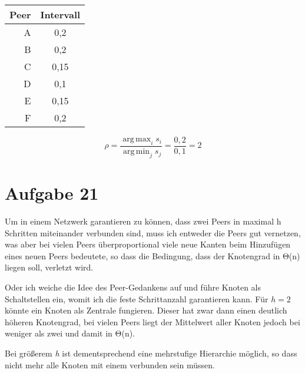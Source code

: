 \documentclass[10pt,a4paper]{article}
\DeclareMathOperator*{\argmax}{arg\,max}
\DeclareMathOperator*{\argmin}{arg\,min}
\begin{document}
\begin{tabular}{ r | c }
  Peer & Intervall \\
  \hline
  A & 0,2 \\
  B & 0,2 \\
  C & 0,15 \\
  D & 0,1 \\
  E & 0,15 \\
  F & 0,2 \\
\end{tabular}

\begin{equation}
  \rho = \frac{\argmax_i s_i}{\argmin_j s_j} = \frac{0,2}{0,1} = 2

\end{equation}

\section*{Aufgabe 21}
Um in einem Netzwerk garantieren zu können, dass zwei Peers in maximal h Schritten miteinander verbunden sind, muss ich entweder die Peers gut vernetzen, was aber bei vielen Peers überproportional viele neue Kanten beim Hinzufügen eines neuen Peers bedeutete, so dass die Bedingung, dass der Knotengrad in Θ(n) liegen soll, verletzt wird.

Oder ich weiche die Idee des Peer-Gedankens auf und führe Knoten als Schaltstellen ein, womit ich die feste Schrittanzahl garantieren kann. Für $h=2$ könnte ein Knoten als Zentrale fungieren. Dieser hat zwar dann einen deutlich höheren Knotengrad, bei vielen Peers liegt der Mittelwert aller Knoten jedoch bei weniger als zwei und damit in Θ(n).

Bei größerem \textit{h} ist dementsprechend eine mehrstufige Hierarchie möglich, so dass nicht mehr alle Knoten mit einem verbunden sein müssen.
\end{document}
